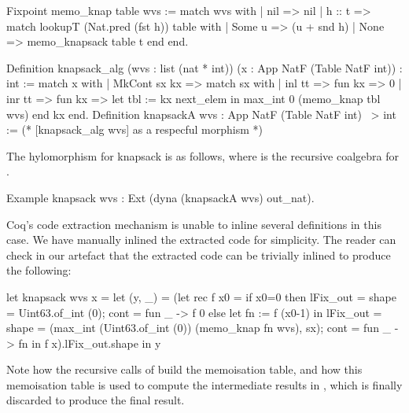 \documentclass{llncs}
\begin{document}
\begin{coqcode}
Fixpoint memo_knap table wvs :=
  match wvs with | nil => nil | h :: t =>
      match lookupT (Nat.pred (fst h)) table with
      | Some u => (u + snd h)%
      | None => memo_knapsack table t
      end
  end.

Definition knapsack_alg (wvs : list (nat * int))
  (x : App NatF (Table NatF int)) : int :=
  match x with | MkCont sx kx => match sx with
  | inl tt => fun kx => 0%
  | inr tt => fun kx => let tbl := kx next_elem in max_int 0 (memo_knap tbl wvs)
  end kx end.
Definition knapsackA wvs : App NatF (Table NatF int) ~> int := 
  (* [knapsack_alg wvs] as a respecful morphism *)
\end{coqcode}
The hylomorphism for knapsack is as follows, where  is the
recursive coalgebra for .
\begin{coqcode}
Example knapsack wvs : Ext (dyna (knapsackA wvs) out_nat).
\end{coqcode}
Coq's code extraction mechanism is unable to inline several definitions in this
case. We have manually inlined the extracted code for simplicity. The reader
can check in our artefact that the extracted code can be trivially
inlined to produce the following:
\begin{ocamlcode}
let knapsack wvs x = let (y, _) =
    (let rec f x0 =
      if x0=0 then
        { lFix_out = {
             shape = Uint63.of_int (0);
             cont  = fun _ -> f 0 } }
      else let fn := f (x0-1) in { lFix_out = { 
           shape = (max_int (Uint63.of_int (0)) (memo_knap fn wvs), sx);
           cont = fun _ -> fn } }
     in f x).lFix_out.shape in y
\end{ocamlcode}
Note how the recursive calls of  build the memoisation table, and how
this memoisation table is used to compute the intermediate results in
, which is finally discarded to produce the final result.
\end{document}
